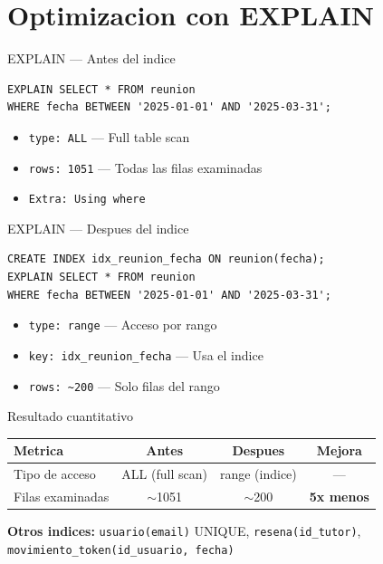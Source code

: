 ﻿\documentclass[11pt,aspectratio=169]{beamer}
\begin{document}
\section{Optimizacion con EXPLAIN}

\begin{frame}[fragile]{EXPLAIN --- Antes del indice}
    \begin{lstlisting}
EXPLAIN SELECT * FROM reunion
WHERE fecha BETWEEN '2025-01-01' AND '2025-03-31';
    \end{lstlisting}
    \begin{itemize}
        \item \texttt{type: ALL} --- Full table scan
        \item \texttt{rows: 1051} --- Todas las filas examinadas
        \item \texttt{Extra: Using where}
    \end{itemize}
\end{frame}

\begin{frame}[fragile]{EXPLAIN --- Despues del indice}
    \begin{lstlisting}
CREATE INDEX idx_reunion_fecha ON reunion(fecha);
EXPLAIN SELECT * FROM reunion
WHERE fecha BETWEEN '2025-01-01' AND '2025-03-31';
    \end{lstlisting}
    \begin{itemize}
        \item \texttt{type: range} --- Acceso por rango
        \item \texttt{key: idx\_reunion\_fecha} --- Usa el indice
        \item \texttt{rows: \textasciitilde200} --- Solo filas del rango
    \end{itemize}
\end{frame}

\begin{frame}{Resultado cuantitativo}
    \begin{table}
        \begin{tabular}{lccc}
            \toprule
            \textbf{Metrica} & \textbf{Antes} & \textbf{Despues} & \textbf{Mejora} \\
            \midrule
            Tipo de acceso & ALL (full scan) & range (indice) & --- \\
            Filas examinadas & $\sim$1051 & $\sim$200 & \textbf{5x menos} \\
            \bottomrule
        \end{tabular}
    \end{table}
    \textbf{Otros indices:} \texttt{usuario(email)} UNIQUE, \texttt{resena(id\_tutor)}, \texttt{movimiento\_token(id\_usuario, fecha)}
\end{frame}
\end{document}
